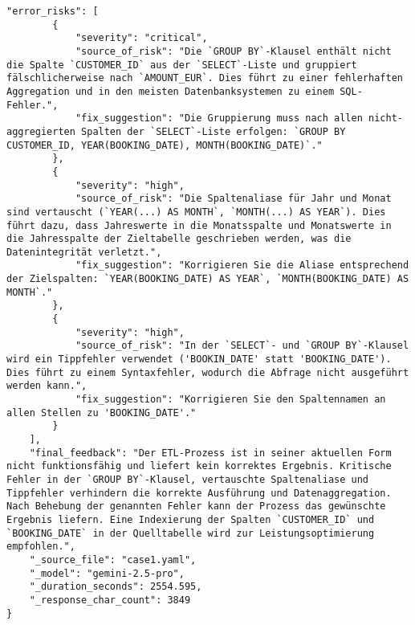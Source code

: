 \begin{lstlisting}[caption={Ausgabe: Gemini 2.5 Pro Anwendungsfall 1 Robustheitsdurchlauf},label={gemini_case1_prompt3}]
    "error_risks": [
        {
            "severity": "critical",
            "source_of_risk": "Die `GROUP BY`-Klausel enthält nicht die Spalte `CUSTOMER_ID` aus der `SELECT`-Liste und gruppiert fälschlicherweise nach `AMOUNT_EUR`. Dies führt zu einer fehlerhaften Aggregation und in den meisten Datenbanksystemen zu einem SQL-Fehler.",
            "fix_suggestion": "Die Gruppierung muss nach allen nicht-aggregierten Spalten der `SELECT`-Liste erfolgen: `GROUP BY CUSTOMER_ID, YEAR(BOOKING_DATE), MONTH(BOOKING_DATE)`."
        },
        {
            "severity": "high",
            "source_of_risk": "Die Spaltenaliase für Jahr und Monat sind vertauscht (`YEAR(...) AS MONTH`, `MONTH(...) AS YEAR`). Dies führt dazu, dass Jahreswerte in die Monatsspalte und Monatswerte in die Jahresspalte der Zieltabelle geschrieben werden, was die Datenintegrität verletzt.",
            "fix_suggestion": "Korrigieren Sie die Aliase entsprechend der Zielspalten: `YEAR(BOOKING_DATE) AS YEAR`, `MONTH(BOOKING_DATE) AS MONTH`."
        },
        {
            "severity": "high",
            "source_of_risk": "In der `SELECT`- und `GROUP BY`-Klausel wird ein Tippfehler verwendet ('BOOKIN_DATE' statt 'BOOKING_DATE'). Dies führt zu einem Syntaxfehler, wodurch die Abfrage nicht ausgeführt werden kann.",
            "fix_suggestion": "Korrigieren Sie den Spaltennamen an allen Stellen zu 'BOOKING_DATE'."
        }
    ],
    "final_feedback": "Der ETL-Prozess ist in seiner aktuellen Form nicht funktionsfähig und liefert kein korrektes Ergebnis. Kritische Fehler in der `GROUP BY`-Klausel, vertauschte Spaltenaliase und Tippfehler verhindern die korrekte Ausführung und Datenaggregation. Nach Behebung der genannten Fehler kann der Prozess das gewünschte Ergebnis liefern. Eine Indexierung der Spalten `CUSTOMER_ID` und `BOOKING_DATE` in der Quelltabelle wird zur Leistungsoptimierung empfohlen.",
    "_source_file": "case1.yaml",
    "_model": "gemini-2.5-pro",
    "_duration_seconds": 2554.595,
    "_response_char_count": 3849
}
\end{lstlisting}

